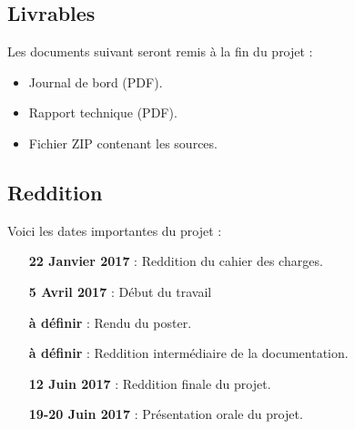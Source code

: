 \documentclass[a4paper]{article}
\begin{document}
\subsection{Livrables}
Les documents suivant seront remis à la fin du projet :

\begin{itemize}
    \item Journal de bord (PDF).
    \item Rapport technique (PDF).
    \item Fichier ZIP contenant les sources.
\end{itemize}

\subsection{Reddition}
Voici les dates importantes du projet : 

\begin{framed}
    \begin{itemize}[leftmargin=4cm]
        \item[\textbf{22 Janvier 2017} :] Reddition du cahier des charges.
        \item[\textbf{5 Avril 2017} :] Début du travail
        \item[\textbf{à définir} :] Rendu du poster.
        \item[\textbf{à définir} :] Reddition intermédiaire de la documentation.
        \item[\textbf{12 Juin 2017} :] Reddition finale du projet.
        \item[\textbf{19-20 Juin 2017} :] Présentation orale du projet.
    \end{itemize}
\end{framed}
\end{document}

